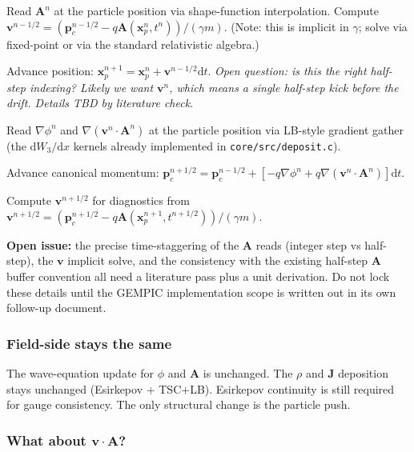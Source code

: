 \documentclass[11pt,a4paper]{article}
\newcommand{\vv}[1]{\mathbf{#1}}
\newcommand{\dd}{\mathrm{d}}
\begin{document}
\begin{algsteps}
  \item Read $\vv{A}^n$ at the particle position via shape-function
    interpolation.  Compute
    $\vv{v}^{n-1/2} = (\vv{p}_c^{n-1/2} - q \vv{A}(\vv{x}_p^n, t^n)) / (\gamma m)$.
    (Note: this is implicit in $\gamma$; solve via fixed-point or
    via the standard relativistic algebra.)
  \item Advance position: $\vv{x}_p^{n+1} = \vv{x}_p^n + \vv{v}^{n-1/2} \dd t$.
    \emph{Open question: is this the right half-step indexing?  Likely
    we want $\vv{v}^n$, which means a single half-step kick before
    the drift.  Details TBD by literature check.}
  \item Read $\nabla\phi^{n}$ and $\nabla(\vv{v}^n \cdot \vv{A}^n)$ at
    the particle position via LB-style gradient gather (the
    $\dd W_3 / \dd x$ kernels already implemented in
    \texttt{core/src/deposit.c}).
  \item Advance canonical momentum:
    $\vv{p}_c^{n+1/2} = \vv{p}_c^{n-1/2} + [-q\nabla\phi^n + q\nabla(\vv{v}^n \cdot \vv{A}^n)] \dd t$.
  \item Compute $\vv{v}^{n+1/2}$ for diagnostics from
    $\vv{v}^{n+1/2} = (\vv{p}_c^{n+1/2} - q \vv{A}(\vv{x}_p^{n+1}, t^{n+1/2})) / (\gamma m)$.
\end{algsteps}

\textbf{Open issue:} the precise time-staggering of the
$\vv{A}$ reads (integer step vs half-step), the $\vv{v}$ implicit
solve, and the consistency with the existing half-step $\vv{A}$
buffer convention all need a literature pass plus a unit derivation.
Do not lock these details until the GEMPIC implementation scope is
written out in its own follow-up document.

\subsubsection*{Field-side stays the same}

The wave-equation update for $\phi$ and $\vv{A}$ is unchanged.  The
$\rho$ and $\vv{J}$ deposition stays unchanged (Esirkepov +
TSC$+$LB).  Esirkepov continuity is still required for gauge
consistency.  The only structural change is the particle push.

\subsubsection*{What about $\vv{v}\cdot\vv{A}$?}
\end{document}
